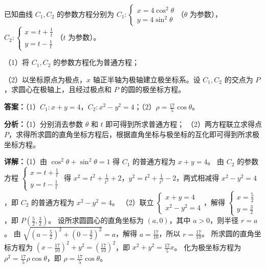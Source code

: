 \begin{question}[points=10]
[选修4—4：坐标系与参数方程]

已知曲线 $C_1, C_2$ 的参数方程分别为 $C_1:\begin{cases} x=4\cos^2\theta \\ y=4\sin^2\theta \end{cases}$（$\theta$ 为参数），$C_2:\begin{cases} x=t+\frac{1}{t} \\ y=t-\frac{1}{t} \end{cases}$（$t$ 为参数）。

（1）将 $C_1, C_2$ 的参数方程化为普通方程；

（2）以坐标原点为极点，$x$ 轴正半轴为极轴建立极坐标系。设 $C_1, C_2$ 的交点为 $P$，求圆心在极轴上，且经过极点和 $P$ 的圆的极坐标方程。
\begin{solution}
\textbf{答案：}（1）$C_1: x+y=4$，$C_2: x^2-y^2=4$；（2）$\rho=\frac{17}{5}\cos\theta$。

\textbf{分析：}（1）分别消去参数 $\theta$ 和 $t$ 即可得到所求普通方程；
（2）两方程联立求得点 $P$，求得所求圆的直角坐标方程后，根据直角坐标与极坐标的互化即可得到所求极坐标方程。

\textbf{详解：}（1）由 $\cos^2\theta+\sin^2\theta=1$ 得 $C_1$ 的普通方程为 $x+y=4$。
由 $C_2$ 的参数方程 $\begin{cases} x=t+\frac{1}{t} \\ y=t-\frac{1}{t} \end{cases}$ 得 $x^2=t^2+\frac{1}{t^2}+2$，$y^2=t^2+\frac{1}{t^2}-2$，两式相减得 $x^2-y^2=4$，即 $C_2$ 的普通方程为 $x^2-y^2=4$。
（2）联立 $\begin{cases} x+y=4 \\ x^2-y^2=4 \end{cases}$，解得 $\begin{cases} x=\frac{5}{2} \\ y=\frac{3}{2} \end{cases}$，即 $P\left(\frac{5}{2},\frac{3}{2}\right)$。
设所求圆圆心的直角坐标为 $(a,0)$，其中 $a>0$，则半径 $r=a$。
由 $\sqrt{\left(a-\frac{5}{2}\right)^2+\left(0-\frac{3}{2}\right)^2}=a$，解得 $a=\frac{17}{10}$，所以 $r=\frac{17}{10}$。
所求圆的直角坐标方程为 $\left(x-\frac{17}{10}\right)^2+y^2=\left(\frac{17}{10}\right)^2$，即 $x^2+y^2=\frac{17}{5}x$。
化为极坐标方程为 $\rho^2=\frac{17}{5}\rho\cos\theta$，即 $\rho=\frac{17}{5}\cos\theta$。
\end{solution}
\end{question}

